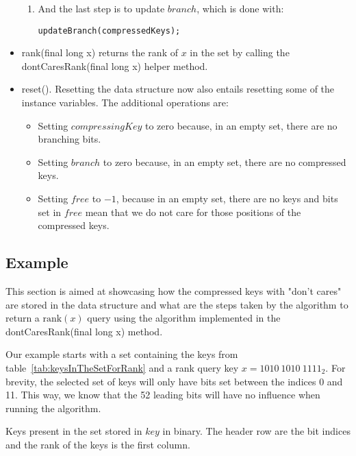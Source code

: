 \begin{itemize}
\begin{enumerate}
        \item
        And the last step is to update $branch$, which is done with:
        \begin{lstlisting}
updateBranch(compressedKeys);
        \end{lstlisting}
    \end{enumerate}
    
    \item
    {\ttfamily rank(final long x)} returns the rank of $x$ in the set by calling the {\ttfamily dontCaresRank(final long x)} helper method.
    
    \item
    {\ttfamily reset()}.
    Resetting the data structure now also entails resetting some of the instance variables. The additional operations are:
    \begin{itemize}
        \item
        Setting $compressingKey$ to zero because, in an empty set, there are no branching bits.
        
        \item
        Setting $branch$ to zero because, in an empty set, there are no compressed keys.
        
        \item
        Setting $free$ to $-1$, because in an empty set, there are no keys and bits set in $free$ mean that we do not care for those positions of the compressed keys.
    \end{itemize}
\end{itemize}

\subsection{Example} \label{sec:dontCaresRankExample}

This section is aimed at showcasing how the compressed keys with "don't cares" are stored in the data structure and what are the steps taken by the algorithm to return a $\text{rank}(x)$ query using the algorithm implemented in the {\ttfamily dontCaresRank(final long x)} method.

Our example starts with a set containing the keys from table~\ref{tab:keysInTheSetForRank} and a rank query key $x = 1010\ 1010\ 1111_2$. For brevity, the selected set of keys will only have bits set between the indices 0 and 11. This way, we know that the 52 leading bits will have no influence when running the algorithm.

\begin{table}[H]
\centering

\caption{Keys present in the set stored in $key$ in binary. The header row are the bit indices and the rank of the keys is the first column.}
\label{tab:keysInTheSetForRank}
\end{table}

